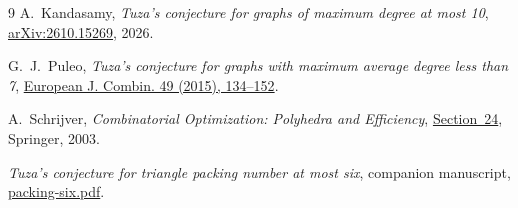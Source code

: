 \documentclass[11pt]{article}
\begin{document}
\begin{thebibliography}{9}
A.~Kandasamy, \emph{Tuza's conjecture for graphs of maximum degree at most 10},
\href{https://arxiv.org/abs/2610.15269}{arXiv:2610.15269}, 2026.

G.~J.~Puleo, \emph{Tuza's conjecture for graphs with maximum average degree less than 7},
\href{https://doi.org/10.1016/j.ejc.2015.03.006}{European J. Combin. 49 (2015), 134--152}.

A.~Schrijver, \emph{Combinatorial Optimization: Polyhedra and Efficiency},
\href{https://www.lamsade.dauphine.fr/~cornaz/Enseignement/M2_MODO/DATA/A3.PDF}{Section~24}, Springer, 2003.

\emph{Tuza's conjecture for triangle packing number at most six}, companion manuscript,
\href{run:packing-six.pdf}{packing-six.pdf}.
\end{thebibliography}
\end{document}
